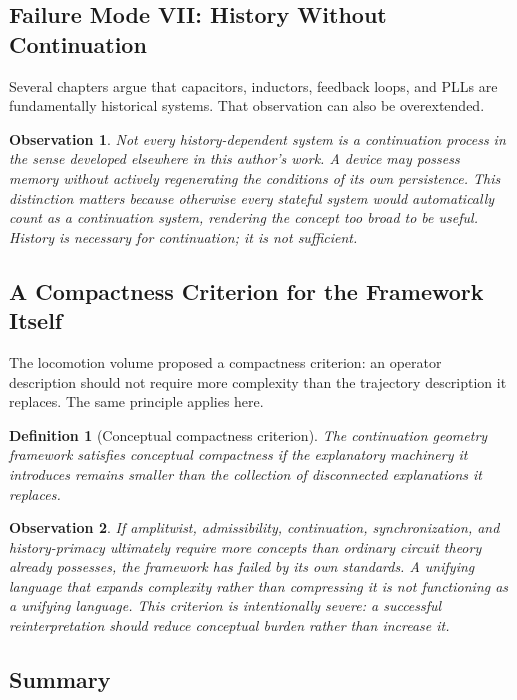 \documentclass[12pt]{article}
\newtheorem{definition}{Definition}
\newtheorem{observation}{Observation}
\begin{document}
\subsection{Failure Mode VII: History Without Continuation}

Several chapters argue that capacitors, inductors, feedback loops, and PLLs are fundamentally historical systems. That observation can also be overextended.

\begin{observation}
Not every history-dependent system is a continuation process in the sense developed elsewhere in this author's work. A device may possess memory without actively regenerating the conditions of its own persistence. This distinction matters because otherwise every stateful system would automatically count as a continuation system, rendering the concept too broad to be useful. History is necessary for continuation; it is not sufficient.
\end{observation}

\subsection{A Compactness Criterion for the Framework Itself}

The locomotion volume proposed a compactness criterion: an operator description should not require more complexity than the trajectory description it replaces. The same principle applies here.

\begin{definition}[Conceptual compactness criterion]
The continuation geometry framework satisfies conceptual compactness if the explanatory machinery it introduces remains smaller than the collection of disconnected explanations it replaces.
\end{definition}

\begin{observation}
If amplitwist, admissibility, continuation, synchronization, and history-primacy ultimately require more concepts than ordinary circuit theory already possesses, the framework has failed by its own standards. A unifying language that expands complexity rather than compressing it is not functioning as a unifying language. This criterion is intentionally severe: a successful reinterpretation should reduce conceptual burden rather than increase it.
\end{observation}

\subsection{Summary}
\end{document}
